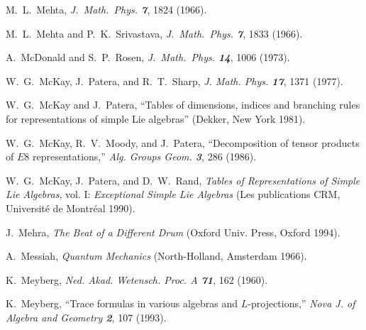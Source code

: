  M.~L.~Mehta,
{\em J.~Math.~Phys.  \bf 7}, 1824 (1966).

 M.~L.~Mehta and P.~K.~Srivastava,
{\em J.~Math.~Phys.  \bf 7}, 1833 (1966).

 A.~McDonald and S.~P.~Rosen,
{\em J.~Math.~Phys.  \bf 14}, 1006 (1973).

 W.~G.~McKay, J.~Patera, and R.~T.~Sharp,
{\em J. Math. Phys.  \bf 17}, 1371 (1977).

 W.~G.~McKay and J.~Patera,
    ``Tables of dimensions, indices and branching rules for representations of
      simple Lie algebras''
    (Dekker, New York 1981).

 W.~G.~McKay, R.~V.~Moody, and J.~Patera,
``Decomposition of tensor products of $E8$ representations,''
{\em Alg. Groups Geom. \bf 3}, 286 (1986).

 W.~G.~McKay, J.~Patera, and D.~W.~Rand,
{\em Tables of Representations of Simple Lie Algebras}, vol.{ I}:
{\em Exceptional Simple Lie Algebras}
(Les publications CRM, Universit{\'e} de Montr{\'e}al 1990).

 J.~Mehra,
    {\em The Beat of a Different Drum}
    (Oxford Univ. Press, Oxford 1994).

 A.~Messiah,
    {\em Quantum Mechanics}
    (North-Holland, Amsterdam 1966).


 K.~Meyberg,
{\em Ned. Akad. Wetensch. Proc.  A \bf 71}, 162 (1960).


 K.~Meyberg,
    ``Trace formulas in various algebras and $L$-projections,''
    {\em Nova J. of Algebra and Geometry \bf 2}, 107 (1993). %

